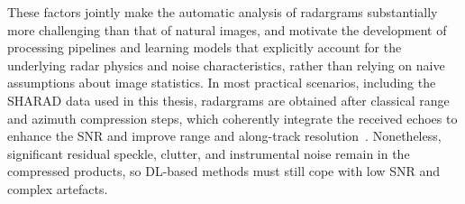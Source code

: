 These factors jointly make the automatic analysis of radargrams substantially more challenging than that of natural images, and motivate the development of processing pipelines and learning models that explicitly account for the underlying radar physics and noise characteristics, rather than relying on naive assumptions about image statistics.
In most practical scenarios, including the SHARAD data used in this thesis, radargrams are obtained after classical range and azimuth compression steps, which coherently integrate the received echoes to enhance the SNR and improve range and along-track resolution~\cite{yebasse2025advances}.
Nonetheless, significant residual speckle, clutter, and instrumental noise remain in the compressed products, so DL-based methods must still cope with low SNR and complex artefacts.

